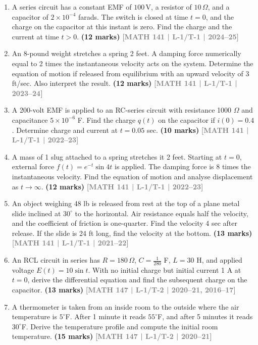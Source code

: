 \documentclass[12pt,a3paper]{article}
\newcommand{\yr}[1]{\hfill\textcolor{gray}{\small\textbf{[#1]}}}
\newcommand{\mk}[1]{\textcolor{orange!70!black}{\small\textbf{(#1 marks)}}}
\begin{document}
\begin{enumerate}

\item A series circuit has a constant EMF of $100\,\text{V}$, a resistor of
    $10\,\Omega$, and a capacitor of $2\times10^{-4}$ farads. The switch is closed at
    time $t=0$, and the charge on the capacitor at this instant is zero. Find the
    charge and the current at time $t>0$.
\mk{12} \yr{MATH 141 | L-1/T-1 | 2024--25}
  
\item An 8-pound weight stretches a spring 2 feet. A damping force numerically equal to 2 times the instantaneous velocity acts on the system. Determine the equation of motion if released from equilibrium with an upward velocity of 3 ft/sec. Also interpret the result.
\mk{12} \yr{MATH 141 | L-1/T-1 | 2023--24}

\item A 200-volt EMF is applied to an RC-series circuit with resistance 1000 $\Omega$ and capacitance $5\times10^{-6}$ F. Find the charge $q(t)$ on the capacitor if $i(0)=0.4$. Determine charge and current at $t=0.05$ sec.
\mk{10} \yr{MATH 141 | L-1/T-1 | 2022--23}

\item A mass of 1 slug attached to a spring stretches it 2 feet. Starting at $t=0$, external force $f(t)=e^{-t}\sin 4t$ is applied. The damping force is 8 times the instantaneous velocity. Find the equation of motion and analyse displacement as $t\to\infty$.
\mk{12} \yr{MATH 141 | L-1/T-1 | 2022--23}

\item An object weighing 48 lb is released from rest at the top of a plane metal slide inclined at $30^{\circ}$ to the horizontal. Air resistance equals half the velocity, and the coefficient of friction is one-quarter. Find the velocity 4 sec after release. If the slide is 24 ft long, find the velocity at the bottom.
\mk{13} \yr{MATH 141 | L-1/T-1 | 2021--22}

\item An RCL circuit in series has $R=180\,\Omega$, $C=\tfrac{1}{280}$ F, $L=30$ H, and applied voltage $E(t)=10\sin t$. With no initial charge but initial current 1 A at $t=0$, derive the differential equation and find the subsequent charge on the capacitor.
\mk{13} \yr{MATH 147 | L-1/T-2 | 2020--21, 2016--17}

\item A thermometer is taken from an inside room to the outside where the air temperature is $5^{\circ}$F. After 1 minute it reads $55^{\circ}$F, and after 5 minutes it reads $30^{\circ}$F. Derive the temperature profile and compute the initial room temperature.
\mk{15} \yr{MATH 147 | L-1/T-2 | 2020--21}


\end{enumerate}
\end{document}
